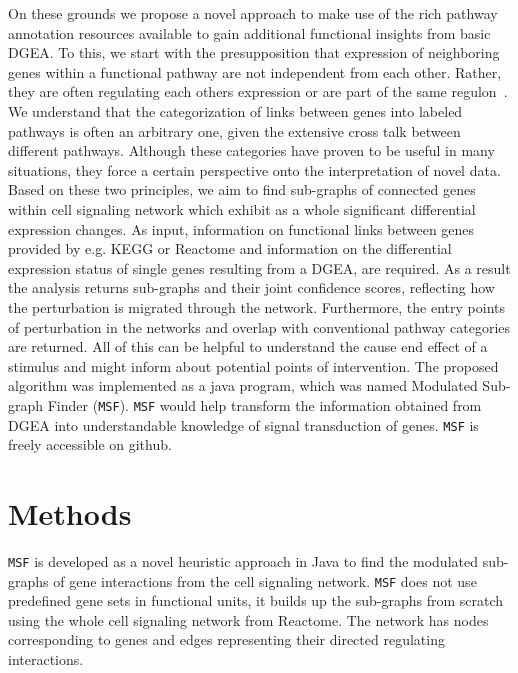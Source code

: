 \documentclass[twocolumn]{article}
\begin{document}
On these grounds we propose a novel approach to make use of the rich
pathway annotation resources available to gain additional functional
insights from basic DGEA. To this, we
start with the presupposition that expression of neighboring genes
within a functional pathway are not independent from each
other. Rather, they are often regulating each others expression or are
part of the same regulon~\cite{Michalak}. We
understand that the categorization of links between genes into labeled
pathways is often an arbitrary one, given the extensive cross talk
between different pathways. Although these categories have proven to be
useful in many situations, they force a certain perspective onto the
interpretation of novel data. Based on these two principles, we aim to
find sub-graphs of connected genes within cell signaling network which exhibit as a whole
significant differential expression changes. As input, information on
functional links between genes provided by e.g. KEGG or Reactome and
information on the differential expression status of single genes
resulting from a DGEA, are required. As a result the analysis returns
sub-graphs and their joint confidence scores, reflecting how the
perturbation is migrated through the network. Furthermore, the entry
points of perturbation in the networks and overlap with conventional
pathway categories are returned. All of this can be helpful to
understand the cause end effect of a stimulus and might inform about
potential points of intervention. The proposed algorithm was
implemented as a java program, which was named Modulated Sub-graph
Finder (\texttt{MSF}). \texttt{MSF} would help transform the information obtained from DGEA into understandable knowledge of signal transduction of genes. \texttt{MSF} is freely accessible on github.

\section*{Methods}
\texttt{MSF} is developed as a novel heuristic approach in Java to
find the modulated sub-graphs of gene interactions from the cell
signaling network. \texttt{MSF} does not use predefined gene sets in functional units, it builds up the sub-graphs from scratch using the whole cell signaling network from Reactome. The network has nodes corresponding to genes and edges representing their directed regulating interactions.
\end{document}
